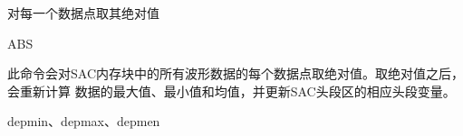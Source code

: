 \label{cmd:abs}

对每一个数据点取其绝对值

\begin{SACSTX}
ABS
\end{SACSTX}

此命令会对SAC内存块中的所有波形数据的每个数据点取绝对值。取绝对值之后，会重新计算
数据的最大值、最小值和均值，并更新SAC头段区的相应头段变量。

depmin、depmax、depmen
